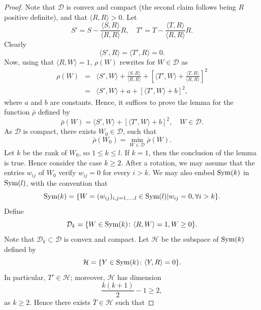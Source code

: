 \documentclass[12pt]{amsart}
\newcommand{\1}{\mathbf 1}
\newcommand{\symm}{\mbox{\rm Sym}}
\begin{document}


\begin{proof} Note that $\mathcal D$ is convex and compact (the second claim follows being $R$ positive definite), and that $\langle R,R\rangle>0$. Let
$$
S'=S-\frac{{\langle S,R\rangle}}{\langle R,R\rangle}R,\quad 
T'=T-\frac{{\langle T,R\rangle}}{\langle R,R\rangle}R.
$$
Clearly 
$$
\langle S',R\rangle=\langle T',R\rangle=0.
$$
Now, using that $\langle R,W\rangle=1$, $\rho(W)$ rewrites for $W\in{\mathcal D}$ as
\begin{eqnarray*}
\rho(W)&=&\langle S',W\rangle+\frac{\langle S,R\rangle}{\langle R,R\rangle}+\left[
\langle T',W\rangle+\frac{\langle T,R\rangle}{\langle R,R\rangle}\right]^2\\
&=&\langle S',W\rangle+a+\left[\langle T',W\rangle+b\right]^2,
\end{eqnarray*}
where $a$ and $b$ are constants. Hence, it suffices to prove the lemma for the function $\bar\rho$ defined by
$$
\bar\rho(W)=\langle S',W\rangle+\left[\langle T',W\rangle+b\right]^2,\quad W\in{\mathcal D}.
$$
As $\mathcal D$ is compact, there exists $W_0\in{\mathcal D}$, such that
\[
\bar\rho(W_0)=\min_{W\in\mathcal {D}}\bar\rho(W).
\]
Let $k$ be the rank of $W_0$, so $1\le k\le l$. If $k=1$, then the conclusion of the lemma is true. Hence consider the case $k\ge 2$. After a rotation, we may assume that the entries $w_{ij}$ of $W_0$ verify $w_{ij}=0$ for every $i>k$. We may also embed $\symm(k)$ in $\symm(l)$, with the convention that
\[
\symm(k)=\{W=(w_{ij})_{i,j=1,\dots,l}\in \symm(l) | w_{ij}=0, \forall i>k\}.
\]
Define
\[
{\mathcal D}_k=\{W\in \symm(k)\colon\langle R,W\rangle=1, W\ge0\}.
\]
Note that ${\mathcal D}_k\subset{\mathcal D}$ is convex and compact. Let $\mathcal H$ be the subspace of $\symm(k)$ defined by
$$
{\mathcal H}=\{Y\in \symm(k)\colon \langle Y,R\rangle=0\}.
$$
In particular, $T'\in {\mathcal H}$; moreover, ${\mathcal H}$ has dimension 
$$
\frac{k(k+1)}{2}-1\ge2,
$$
as $k\ge2$. Hence there exists $\bar T\in{\mathcal H}$ such that 

\end{proof}
\end{document}

